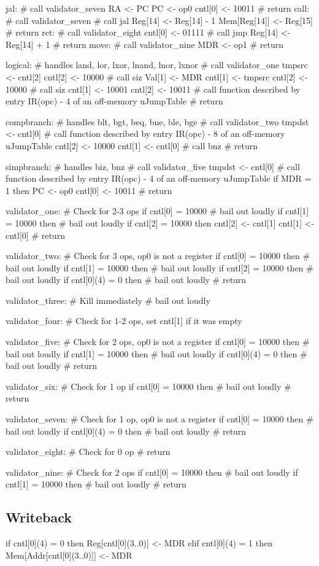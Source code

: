 \documentclass[12pt]{article}
\begin{document}
\begin{verbatimtab}
jal:
    # call validator_seven
    RA <- PC    
    PC <- op0
    cntl[0] <- 10011
    # return
call:
	# call validator_seven
	# call jal
	Reg[14] <- Reg[14] - 1
	Mem[Reg[14]] <- Reg[15]
	# return
ret:
	# call validator_eight
	cntl[0] <- 01111
	# call jmp
	Reg[14] <- Reg[14] + 1
	# return
move:
    # call validator_nine
    MDR <- op1
    # return

logical: # handles land, lor, lxor, lnand, lnor, lxnor
	# call validator_one
	tmpsrc <- cntl[2]
	cntl[2] <- 10000
	# call siz
	Val[1] <- MDR
	cntl[1] <- tmpsrc
	cntl[2] <- 10000
	# call siz
	cntl[1] <- 10001
	cntl[2] <- 10011
	# call function described by entry IR(opc) - 4 of an off-memory uJumpTable
	# return

compbranch: # handles blt, bgt, beq, bne, ble, bge
	# call validator_two
	tmpdst <- cntl[0]
	# call function described by entry IR(opc) - 8 of an off-memory uJumpTable
	cntl[2] <- 10000
	cntl[1] <- cntl[0]
	# call bnz
	# return

simpbranch: # handles biz, bnz
	# call validator_five
	tmpdst <- cntl[0]
	# call function described by entry IR(opc) - 4 of an off-memory uJumpTable
	if MDR = 1 then
		PC <- op0
	cntl[0] <- 10011
	# return

validator_one:
	# Check for 2-3 ops
	if cntl[0] = 10000
		# bail out loudly
	if cntl[1] = 10000 then
		# bail out loudly
	if cntl[2] = 10000 then
		cntl[2] <- cntl[1]
		cntl[1] <- cntl[0]
	# return

validator_two:
	# Check for 3 ops, op0 is not a register
	if cntl[0] = 10000 then
		# bail out loudly
	if cntl[1] = 10000 then
		# bail out loudly
	if cntl[2] = 10000 then
		# bail out loudly
	if cntl[0](4) = 0 then
		# bail out loudly
	# return

validator_three:
	# Kill immediately
	# bail out loudly

validator_four:
	# Check for 1-2 ops, set cntl[1] if it was empty

validator_five:
	# Check for 2 ops, op0 is not a register
	if cntl[0] = 10000 then
		# bail out loudly
	if cntl[1] = 10000 then
		# bail out loudly
	if cntl[0](4) = 0 then
		# bail out loudly
	# return

validator_six:
	# Check for 1 op
	if cntl[0] = 10000 then
		# bail out loudly
	# return

validator_seven:
	# Check for 1 op, op0 is not a register
	if cntl[0] = 10000 then
		# bail out loudly
	if cntl[0](4) = 0 then
		# bail out loudly
	# return

validator_eight:
	# Check for 0 op
	# return

validator_nine:
	# Check for 2 ops
    if cntl[0] = 10000 then
        # bail out loudly
    if cntl[1] = 10000 then
        # bail out loudly
    # return
\end{verbatimtab}

\subsection{Writeback}
\begin{verbatimtab}
if cntl[0](4) = 0 then
   Reg[cntl[0](3..0)] <- MDR
elif cntl[0](4) = 1 then
   Mem[Addr[cntl[0](3..0)]] <- MDR
\end{verbatimtab}
\end{document}
